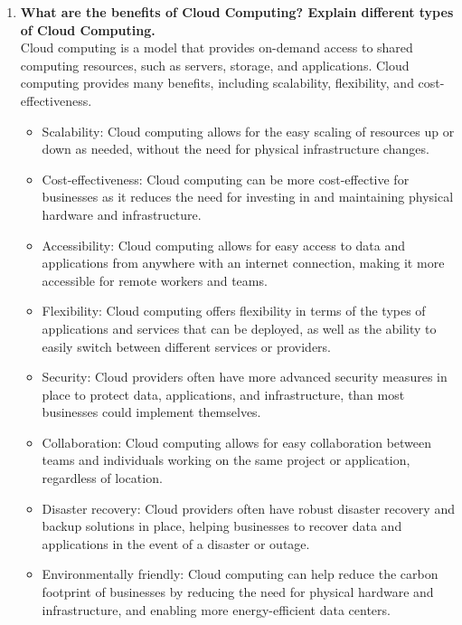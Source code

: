 \documentclass[12pt]{article}
\begin{document}
\begin{enumerate}
\item {\bfseries What are the benefits of Cloud Computing? Explain different types of Cloud Computing.\\}
Cloud computing is a model that provides on-demand access to shared computing resources, such as servers, storage, and applications. Cloud computing provides many benefits, including scalability, flexibility, and cost-effectiveness. 
\begin{itemize}
    \item Scalability: Cloud computing allows for the easy scaling of resources up or down as needed, without the need for physical infrastructure changes.
    \item Cost-effectiveness: Cloud computing can be more cost-effective for businesses as it reduces the need for investing in and maintaining physical hardware and infrastructure.
    \item Accessibility: Cloud computing allows for easy access to data and applications from anywhere with an internet connection, making it more accessible for remote workers and teams.
    \item Flexibility: Cloud computing offers flexibility in terms of the types of applications and services that can be deployed, as well as the ability to easily switch between different services or providers.
    \item Security: Cloud providers often have more advanced security measures in place to protect data, applications, and infrastructure, than most businesses could implement themselves.
    \item Collaboration: Cloud computing allows for easy collaboration between teams and individuals working on the same project or application, regardless of location.
    \item Disaster recovery: Cloud providers often have robust disaster recovery and backup solutions in place, helping businesses to recover data and applications in the event of a disaster or outage.
    \item Environmentally friendly: Cloud computing can help reduce the carbon footprint of businesses by reducing the need for physical hardware and infrastructure, and enabling more energy-efficient data centers.
    \end{itemize}


\end{enumerate}
\end{document}
